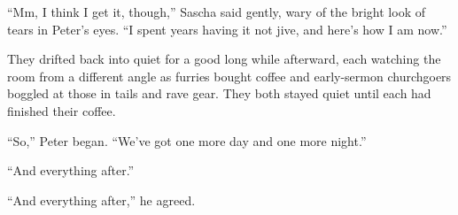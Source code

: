 ``Mm, I think I get it, though,'' Sascha said gently, wary of the bright look of tears in Peter's eyes. ``I spent years having it not jive, and here's how I am now.''

They drifted back into quiet for a good long while afterward, each watching the room from a different angle as furries bought coffee and early-sermon churchgoers boggled at those in tails and rave gear. They both stayed quiet until each had finished their coffee.

``So,'' Peter began. ``We've got one more day and one more night.''

``And everything after.''

``And everything after,'' he agreed.
